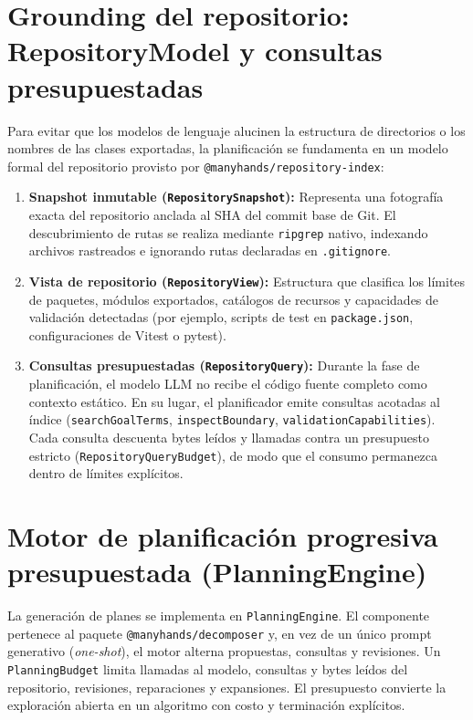 \section{Grounding del repositorio: RepositoryModel y consultas presupuestadas}

Para evitar que los modelos de lenguaje alucinen la estructura de directorios o los nombres de las clases exportadas, la planificación se fundamenta en un modelo formal del repositorio provisto por \texttt{@manyhands/repository-index}:

\begin{enumerate}
  \item \textbf{Snapshot inmutable (\texttt{RepositorySnapshot}):} Representa una fotografía exacta del repositorio anclada al SHA del commit base de Git. El descubrimiento de rutas se realiza mediante \texttt{ripgrep} nativo, indexando archivos rastreados e ignorando rutas declaradas en \texttt{.gitignore}.
  \item \textbf{Vista de repositorio (\texttt{RepositoryView}):} Estructura que clasifica los límites de paquetes, módulos exportados, catálogos de recursos y capacidades de validación detectadas (por ejemplo, scripts de test en \texttt{package.json}, configuraciones de Vitest o pytest).
  \item \textbf{Consultas presupuestadas (\texttt{RepositoryQuery}):} Durante la fase de planificación, el modelo LLM no recibe el código fuente completo como contexto estático. En su lugar, el planificador emite consultas acotadas al índice (\texttt{searchGoalTerms}, \texttt{inspectBoundary}, \texttt{validationCapabilities}). Cada consulta descuenta bytes leídos y llamadas contra un presupuesto estricto (\texttt{RepositoryQueryBudget}), de modo que el consumo permanezca dentro de límites explícitos.
\end{enumerate}

\section{Motor de planificación progresiva presupuestada (PlanningEngine)}
\label{sec:planning-engine}

La generación de planes se implementa en \texttt{PlanningEngine}. El componente
pertenece al paquete \texttt{@manyhands/decomposer} y, en vez de un único prompt generativo
(\emph{one-shot}), el motor alterna propuestas, consultas y revisiones. Un
\texttt{PlanningBudget} limita llamadas al modelo, consultas y bytes leídos del
repositorio, revisiones, reparaciones y expansiones. El presupuesto convierte la
exploración abierta en un algoritmo con costo y terminación explícitos.

